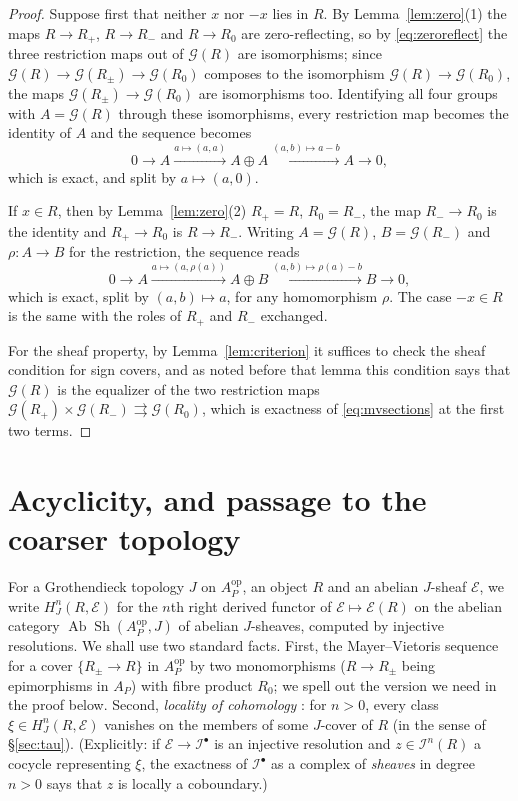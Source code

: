 \documentclass[11pt]{article}
\newcommand{\Sh}{\operatorname{Sh}}
\newcommand{\Ab}{\operatorname{Ab}}
\newcommand{\G}{\mathcal G}
\newcommand{\E}{\mathcal E}
\newcommand{\I}{\mathcal I}
\theoremstyle{definition}
\theoremstyle{remark}
\begin{document}
\begin{proof}
Suppose first that neither \(x\) nor \(-x\) lies in \(R\).  By
Lemma~\ref{lem:zero}(1) the maps \(R\to R_+\), \(R\to R_-\) and
\(R\to R_0\) are zero-reflecting, so by \eqref{eq:zeroreflect} the three
restriction maps out of \(\G(R)\) are isomorphisms; since
\(\G(R)\to\G(R_\pm)\to\G(R_0)\) composes to the isomorphism
\(\G(R)\to\G(R_0)\), the maps \(\G(R_\pm)\to\G(R_0)\) are isomorphisms too.
Identifying all four groups with \(A=\G(R)\) through these isomorphisms,
every restriction map becomes the identity of \(A\) and the sequence
becomes
\[
                   0\longrightarrow A
                    \xrightarrow{a\mapsto(a,a)}A\oplus A
                    \xrightarrow{(a,b)\mapsto a-b}A
                    \longrightarrow0,
\]
which is exact, and split by \(a\mapsto(a,0)\).

If \(x\in R\), then by Lemma~\ref{lem:zero}(2) \(R_+=R\), \(R_0=R_-\), the
map \(R_-\to R_0\) is the identity and \(R_+\to R_0\) is \(R\to R_-\).
Writing \(A=\G(R)\), \(B=\G(R_-)\) and \(\rho:A\to B\) for the restriction,
the sequence reads
\[
                   0\longrightarrow A
                    \xrightarrow{a\mapsto(a,\rho(a))}A\oplus B
                    \xrightarrow{(a,b)\mapsto \rho(a)-b}B
                    \longrightarrow0,
\]
which is exact, split by \((a,b)\mapsto a\), for any homomorphism \(\rho\).
The case \(-x\in R\) is the same with the roles of \(R_+\) and \(R_-\)
exchanged.

For the sheaf property, by Lemma~\ref{lem:criterion} it suffices to check
the sheaf condition for sign covers, and as noted before that lemma this
condition says that \(\G(R)\) is the equalizer of the two restriction maps
\(\G(R_+)\times\G(R_-)\rightrightarrows\G(R_0)\), which is exactness of
\eqref{eq:mvsections} at the first two terms.
\end{proof}

\section{Acyclicity, and passage to the coarser topology}
\label{sec:acyclic}

For a Grothendieck topology \(J\) on \(A_P^{\mathrm{op}}\), an object \(R\)
and an abelian \(J\)-sheaf \(\E\), we write \(H^n_J(R,\E)\) for the \(n\)th
right derived functor of \(\E\mapsto\E(R)\) on the abelian category
\(\Ab\Sh(A_P^{\mathrm{op}},J)\) of abelian \(J\)-sheaves, computed by
injective resolutions.  We shall
use two standard facts.  First, the Mayer--Vietoris sequence
\cite[Tag 0EVY]{stacks} for a cover \(\{R_\pm\to R\}\) in
\(A_P^{\mathrm{op}}\) by two monomorphisms (\(R\to R_\pm\) being
epimorphisms in \(A_P\)) with fibre product \(R_0\); we spell out the
version we need in the proof below.  Second,
\emph{locality of cohomology} \cite[Tag 03P1]{stacks}: for \(n>0\), every
class \(\xi\in H^n_J(R,\E)\) vanishes on the members of some \(J\)-cover
of \(R\) (in the sense of \S\ref{sec:tau}).  (Explicitly: if \(\E\to\I^\bullet\) is an injective
resolution and \(z\in\I^n(R)\) a cocycle representing \(\xi\), the exactness
of \(\I^\bullet\) as a complex of \emph{sheaves} in degree \(n>0\) says that
\(z\) is locally a coboundary.)
\end{document}
